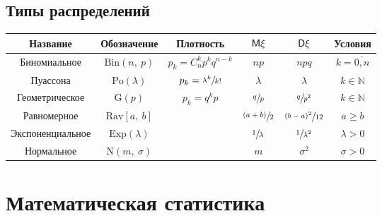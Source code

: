 \subsection{Типы распределений}
\begin{tabu}{|c|c|c|c|c|c|}
	\hline
		Название&Обозначение&Плотность&$\mathsf{M}\xi$&$\mathsf{D}\xi$&Условия \\
	\hline
		Биномиальное&
		$\mathrm{Bin}(n,\ p)$&
		$p_k = C_n^k p^k q^{n-k}$&
		$np$&
		$npq$&
		$k=\overline{0, n}$ \\
	\hline
		Пуассона&
		$\mathrm{Po}(\lambda)$&
		$p_k = \sfrac{\lambda^k}{k!}$&
		$\lambda$&
		$\lambda$&
		$k\in \mathbb{N}$ \\
	\hline
		Геометрическое&
		$\mathrm{G}(p)$&
		$p_k = q^k p$&
		$\sfrac{q}{p}$&
		$\sfrac{q}{p^2}$&
		$k\in \mathbb{N}$ \\
	\hline
		Равномерное&
		$\mathrm{Rav}[a,\ b]$&
		&
		$\sfrac{(a+b)}{2}$&
		$\sfrac{(b-a)^2}{12}$&
		$a \geqslant b$ \\
	\hline
		Экспоненциальное&
		$\mathrm{Exp}(\lambda)$&
		&
		$\sfrac{1}{\lambda}$&
		$\sfrac{1}{\lambda^2}$&
		$\lambda > 0$ \\
	\hline
		Нормальное&
		$\mathrm{N}(m,\ \sigma)$&
		&
		$m$&
		$\sigma^2$&
		$\sigma > 0$ \\
	\hline
\end{tabu}
\section{Математическая статистика}